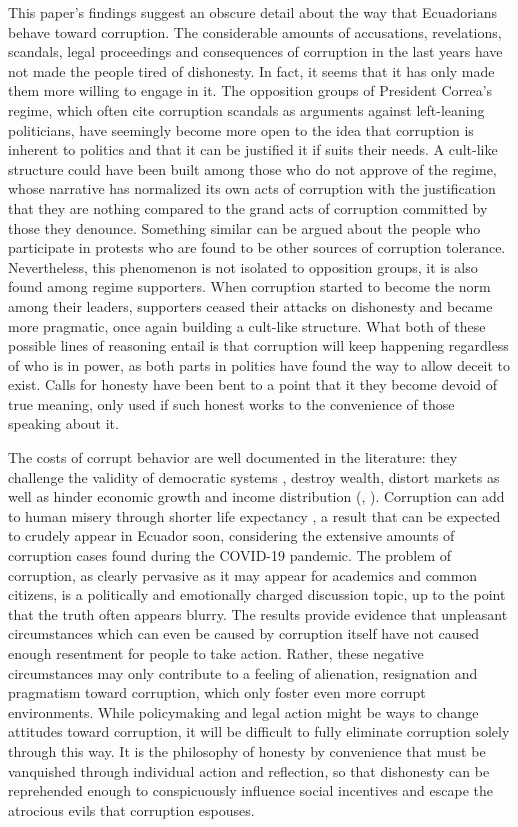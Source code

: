 \documentclass[12pt,a4]{article}\usepackage[]{graphicx}\usepackage[]{xcolor}
\begin{document}
This paper's findings suggest an obscure detail about the way that Ecuadorians behave toward corruption. The considerable amounts of accusations, revelations, scandals, legal proceedings and consequences of corruption in the last years have not made the people tired of dishonesty. In fact, it seems that it has only made them more willing to engage in it. The opposition groups of President Correa's regime, which often cite corruption scandals as arguments against left-leaning politicians, have seemingly become more open to the idea that corruption is inherent to politics and that it can be justified it if suits their needs. A cult-like structure could have been built among those who do not approve of the regime, whose narrative has normalized its own acts of corruption with the justification that they are nothing compared to the grand acts of corruption committed by those they denounce. Something similar can be argued about the people who participate in protests who are found to be other sources of corruption tolerance. Nevertheless, this phenomenon is not isolated to opposition groups, it is also found among regime supporters. When corruption started to become the norm among their leaders, supporters ceased their attacks on dishonesty and became more pragmatic, once again building a cult-like structure. What both of these possible lines of reasoning entail is that corruption will keep happening regardless of who is in power, as both parts in politics have found the way to allow deceit to exist. Calls for honesty have been bent to a point that it they become devoid of true meaning, only used if such honest works to the convenience of those speaking about it. 

The costs of corrupt behavior are well documented in the literature: they challenge the validity of democratic systems \parencite{Moscoso.2018}, destroy wealth, distort markets as well as hinder economic growth and income distribution (\textcite{Shleifer.1993}, \textcite{Singer.2016}). Corruption can add to human misery through shorter life expectancy \parencite{Siverson.2014}, a result that can be expected to crudely appear in Ecuador soon, considering the extensive amounts of corruption cases found during the COVID-19 pandemic. The problem of corruption, as clearly pervasive as it may appear for academics and common citizens, is a politically and emotionally charged discussion topic, up to the point that the truth often appears blurry. The results provide evidence that unpleasant circumstances which can even be caused by corruption itself have not caused enough resentment for people to take action. Rather, these negative circumstances may only contribute to a feeling of alienation, resignation and pragmatism toward corruption, which only foster even more corrupt environments. While policymaking and legal action might be ways to change attitudes toward corruption, it will be difficult to fully eliminate corruption solely through this way. It is the philosophy of honesty by convenience that must be vanquished through individual action and reflection, so that dishonesty can be reprehended enough to conspicuously influence social incentives and escape the atrocious evils that corruption espouses. 
\end{document}
